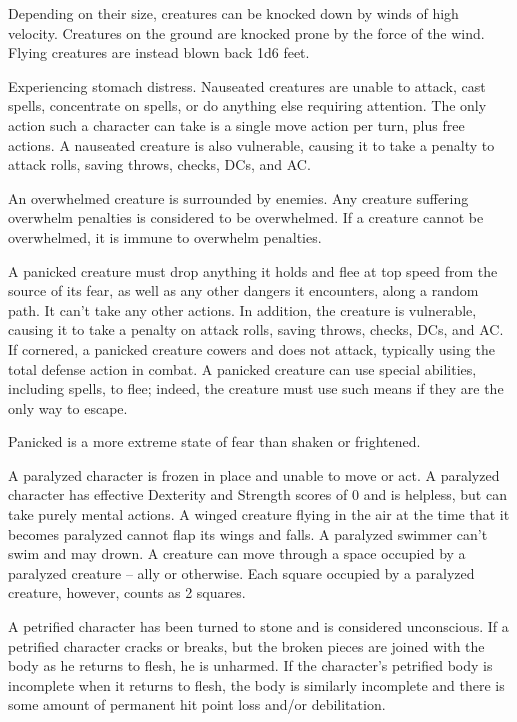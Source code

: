  Depending on their size, creatures can be knocked down by winds of high velocity. Creatures on the ground are knocked prone by the force of the wind. Flying creatures are instead blown back 1d6  feet.

 Experiencing stomach distress. Nauseated creatures are unable to attack, cast spells, concentrate on spells, or do anything else requiring attention. The only action such a character can take is a single move action per turn, plus free actions. A nauseated creature is also vulnerable, causing it to take a  penalty to attack rolls, saving throws, checks, DCs, and AC.

 An overwhelmed creature is surrounded by enemies. Any creature suffering overwhelm penalties is considered to be overwhelmed. If a creature cannot be overwhelmed, it is immune to overwhelm penalties.

 A panicked creature must drop anything it holds and flee at top speed from the source of its fear, as well as any other dangers it encounters, along a random path. It can't take any other actions. In addition, the creature is vulnerable, causing it to take a  penalty on attack rolls, saving throws, checks, DCs, and AC. If cornered, a panicked creature cowers and does not attack, typically using the total defense action in combat. A panicked creature can use special abilities, including spells, to flee; indeed, the creature must use such means if they are the only way to escape.

Panicked is a more extreme state of fear than shaken or frightened.

 A paralyzed character is frozen in place and unable to move or act. A paralyzed character has effective Dexterity and Strength scores of 0 and is helpless, but can take purely mental actions. A winged creature flying in the air at the time that it becomes paralyzed cannot flap its wings and falls. A paralyzed swimmer can't swim and may drown. A creature can move through a space occupied by a paralyzed creature -- ally or otherwise. Each square occupied by a paralyzed creature, however, counts as 2 squares.

 A petrified character has been turned to stone and is considered unconscious. If a petrified character cracks or breaks, but the broken pieces are joined with the body as he returns to flesh, he is unharmed. If the character's petrified body is incomplete when it returns to flesh, the body is similarly incomplete and there is some amount of permanent hit point loss and/or debilitation.

